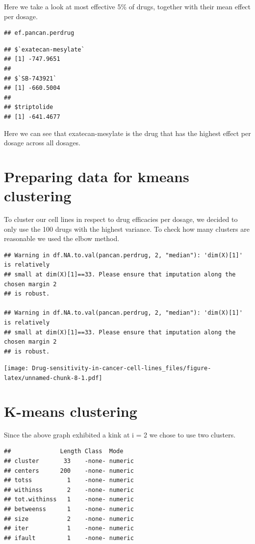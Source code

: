 \documentclass[
]{article}
\begin{document}
Here we take a look at most effective 5\% of drugs, together with their
mean effect per dosage.

\begin{verbatim}
## ef.pancan.perdrug
\end{verbatim}

\begin{verbatim}
## $`exatecan-mesylate`
## [1] -747.9651
## 
## $`SB-743921`
## [1] -660.5004
## 
## $triptolide
## [1] -641.4677
\end{verbatim}

Here we can see that exatecan-mesylate is the drug that has the highest
effect per dosage across all dosages.

\hypertarget{preparing-data-for-kmeans-clustering}{%
\section{Preparing data for kmeans
clustering}\label{preparing-data-for-kmeans-clustering}}

To cluster our cell lines in respect to drug efficacies per dosage, we
decided to only use the 100 drugs with the highest variance. To check
how many clusters are reasonable we used the elbow method.

\begin{verbatim}
## Warning in df.NA.to.val(pancan.perdrug, 2, "median"): 'dim(X)[1]' is relatively
## small at dim(X)[1]==33. Please ensure that imputation along the chosen margin 2
## is robust.

## Warning in df.NA.to.val(pancan.perdrug, 2, "median"): 'dim(X)[1]' is relatively
## small at dim(X)[1]==33. Please ensure that imputation along the chosen margin 2
## is robust.
\end{verbatim}

\texttt{[image: Drug-sensitivity-in-cancer-cell-lines\_files/figure-latex/unnamed-chunk-8-1.pdf]}

\hypertarget{k-means-clustering}{%
\section{K-means clustering}\label{k-means-clustering}}

Since the above graph exhibited a kink at i = 2 we chose to use two
clusters.

\begin{verbatim}
##              Length Class  Mode   
## cluster       33    -none- numeric
## centers      200    -none- numeric
## totss          1    -none- numeric
## withinss       2    -none- numeric
## tot.withinss   1    -none- numeric
## betweenss      1    -none- numeric
## size           2    -none- numeric
## iter           1    -none- numeric
## ifault         1    -none- numeric
\end{verbatim}
\end{document}
